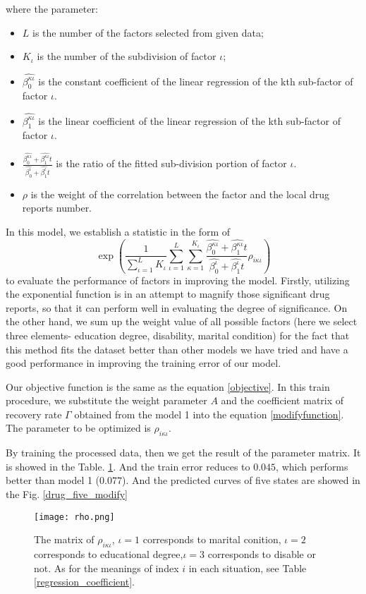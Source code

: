 where the parameter:
\begin{itemize}
	\item $L$ is the number of the factors selected from given data;
	\item $K_\iota$ is the number of the subdivision of factor $\iota$;
	\item $\widehat{\beta _{0}^{\kappa \iota}}$ is the constant coefficient of the linear regression of the kth sub-factor of factor $\iota$.
	\item $\widehat{\beta _{1}^{\kappa \iota}}$ is the linear coefficient of the linear regression of the kth sub-factor of factor $\iota$.\\
	\item $\frac{\widehat{\beta _{0}^{\kappa \iota}}+\widehat{\beta _{1}^{\kappa \iota}}t}{\widehat{\beta _{0}^{\iota}}+\widehat{\beta _{1}^{\iota}}t}$ is the ratio of the fitted sub-division portion of factor $\iota$.\\
	\item $\rho$ is the weight of the correlation between the factor and the local drug reports number.
\end{itemize}

In this model, we establish a statistic in the form of $$\exp \left( \frac{1}{\sum_{\iota =1}^L{K_{\iota}}}\sum_{\iota =1}^L{\sum_{\kappa =1}^{K_{\iota}}{\frac{\widehat{\beta _{0}^{\kappa \iota}}+\widehat{\beta _{1}^{\kappa \iota}}t}{\widehat{\beta _{0}^{\iota}}+\widehat{\beta _{1}^{\iota}}t}}\rho _{i\kappa \iota}} \right)$$ to evaluate the performance of factors in improving the model. Firstly, utilizing the exponential function is in an attempt to magnify those significant drug reports, so that it can perform well in evaluating the degree of significance. On the other hand, we sum up the weight value of all possible factors (here we select three elements- education degree, disability, marital condition) for the fact that this method fits the dataset better than other models we have tried and have a good performance in improving the training error of our model. 

Our objective function is the same as the equation \ref{objective}. In this train procedure, we substitute the weight parameter $A$ and the coefficient matrix of recovery rate $\varGamma$ obtained from the model 1 into the equation \ref{modifyfunction}. The parameter to be optimized is $\rho_{i\kappa\iota}$. 

By training the processed data, then we get the result of the parameter matrix. It is showed in the Table. \ref{rho}. And the train error reduces to $0.045$, which performs better than model 1 ($0.077$). And the predicted curves of five states are showed in the Fig. \ref{drug_five_modify}
\begin{figure}
	\centering
	\texttt{[image: rho.png]}
	\caption{The matrix of $\rho_{i\kappa\iota}$, $\iota=1$ corresponds to marital conition, $\iota=2$ corresponds to educational degree,$\iota=3$ corresponds to disable or not. As for the meanings of index $i$ in each situation, see Table \ref{regression_coefficient}.}
	\label{rho}
\end{figure}

